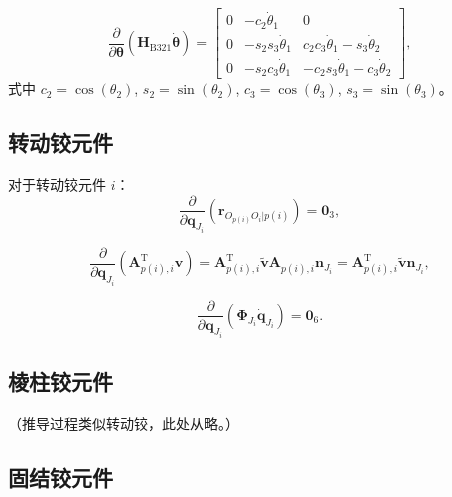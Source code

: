 \begin{equation}\label{eq:11.17}
\frac{\partial}{\partial \boldsymbol{\theta}} \left( \boldsymbol{H}_{\mathrm{B321}} \dot{\boldsymbol{\theta}} \right) =
\begin{bmatrix}
0 & -c_2 \dot{\theta}_1 & 0 \\[3pt]
0 & -s_2 s_3 \dot{\theta}_1 & c_2 c_3 \dot{\theta}_1 - s_3 \dot{\theta}_2 \\[3pt]
0 & -s_2 c_3 \dot{\theta}_1 & -c_2 s_3 \dot{\theta}_1 - c_3 \dot{\theta}_2
\end{bmatrix},
\end{equation}
式中 $c_2 = \cos(\theta_2)$, $s_2 = \sin(\theta_2)$, $c_3 = \cos(\theta_3)$, $s_3 = \sin(\theta_3)$。

\subsection{转动铰元件}

对于转动铰元件 $i$：
\begin{equation}\label{eq:11.18}
\frac{\partial}{\partial \boldsymbol{q}_{J_i}} \left( \boldsymbol{r}_{O_{p(i)}O_i|p(i)} \right) = \boldsymbol{0}_3,
\end{equation}

\begin{equation}\label{eq:11.19}
\frac{\partial}{\partial \boldsymbol{q}_{J_i}} \left( \boldsymbol{A}_{p(i),i}^{\mathrm{T}} \boldsymbol{v} \right) = \boldsymbol{A}_{p(i),i}^{\mathrm{T}} \tilde{\boldsymbol{v}} \boldsymbol{A}_{p(i),i} \boldsymbol{n}_{J_i} = \boldsymbol{A}_{p(i),i}^{\mathrm{T}} \tilde{\boldsymbol{v}} \boldsymbol{n}_{J_i},
\end{equation}

\begin{equation}\label{eq:11.20}
\frac{\partial}{\partial \boldsymbol{q}_{J_i}} \left( \boldsymbol{\Phi}_{J_i} \dot{\boldsymbol{q}}_{J_i} \right) = \boldsymbol{0}_6.
\end{equation}

\subsection{棱柱铰元件}

（推导过程类似转动铰，此处从略。）

\subsection{固结铰元件}

